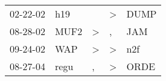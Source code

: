 \begin{supertabular}{p{0.07\textwidth}p{0.06\textwidth}p{0.02\textwidth}p{0.02\textwidth}p{0.06\textwidth}}
 02-22-02\textsuperscript{} &   h19\textsuperscript{} &               &  \textgreater &  DUMP\textsuperscript{} \\
 08-28-02\textsuperscript{} &  MUF2\textsuperscript{} &  \textgreater &             , &   JAM\textsuperscript{} \\
 09-24-02\textsuperscript{} &   WAP\textsuperscript{} &  \textgreater &  \textgreater &   n2f\textsuperscript{} \\
 08-27-04\textsuperscript{} &  regu\textsuperscript{} &             , &  \textgreater &  ORDE\textsuperscript{} \\
\end{supertabular}
